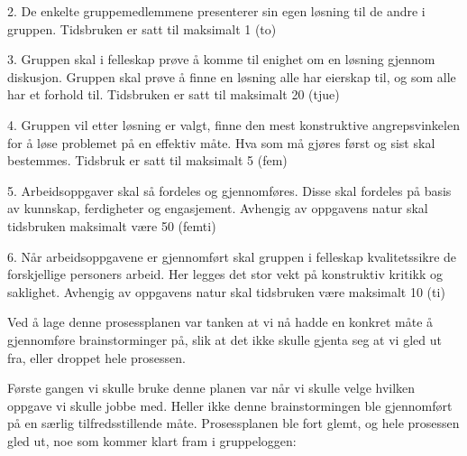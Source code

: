 2. De enkelte gruppemedlemmene presenterer sin egen løsning til de andre i gruppen. Tidsbruken er satt til maksimalt 1 (to) %

3. Gruppen skal i felleskap prøve å komme til enighet om en løsning gjennom diskusjon. Gruppen skal prøve å finne en løsning alle har eierskap til, og som alle har et forhold til. Tidsbruken er satt til maksimalt 20 (tjue) %

4. Gruppen vil etter løsning er valgt, finne den mest konstruktive angrepsvinkelen for å løse problemet på en effektiv måte. Hva som må gjøres først og sist skal bestemmes. Tidsbruk er satt til maksimalt 5 (fem) %

5. Arbeidsoppgaver skal så fordeles og gjennomføres. Disse skal fordeles på basis av kunnskap, ferdigheter og engasjement. Avhengig av oppgavens natur skal tidsbruken maksimalt være 50 (femti) %

6. Når arbeidsoppgavene er gjennomført skal gruppen i felleskap kvalitetssikre de forskjellige personers arbeid. Her legges det stor vekt på konstruktiv kritikk og saklighet. Avhengig av oppgavens natur skal tidsbruken være maksimalt 10 (ti) %

Ved å lage denne prosessplanen var tanken at vi nå hadde en konkret måte å gjennomføre brainstorminger på, slik at det ikke skulle gjenta seg at vi gled ut fra, eller droppet hele prosessen.

Første gangen vi skulle bruke denne planen var når vi skulle velge hvilken oppgave vi skulle jobbe med. Heller ikke denne brainstormingen ble gjennomført på en særlig tilfredsstillende måte. Prosessplanen ble fort glemt, og hele prosessen gled ut, noe som kommer klart fram i gruppeloggen: \newline

